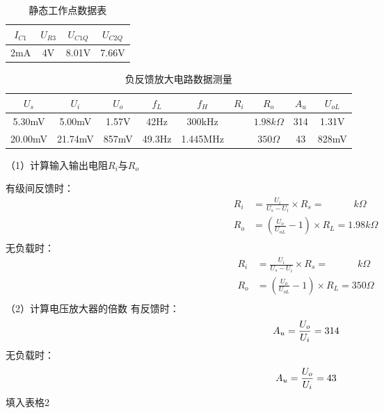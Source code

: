\documentclass{article}
\begin{document}
    \begin{table}[h]
        \centering  
        \begin{tabular}{c|c|c|c}
            \hline
                $I_{C1}$  &  $U_{R3}$    & $U_{C1Q}$     & $U_{C2Q}$   \\ \hline
                      2mA &   4V         & 8.01V         &7.66V        \\ \hline
        \end{tabular}
        \caption{静态工作点数据表}\label{SIGN}
        \end{table}
        
    \begin{table}[h]
        \centering  
        \begin{tabular}{c|c|c|c|c|c|c|c|c}
            \hline
            
                $U_s$   &  $U_i$    & $U_o$    & $f_L$  &  $f_H$    &  $R_i$                &  $R_o$          &  $A_u$  &  $U_{oL}$ \\ \hline
                5.30mV  &  5.00mV   & 1.57V    & 42Hz   &  300kHz   & \qquad \qquad \qquad  &  $1.98k\Omega$  &  314    &  1.31V    \\ \hline
                20.00mV &  21.74mV  & 857mV    & 49.3Hz &  1.445MHz & \qquad \qquad \qquad  &  $350\Omega$    &  43     &  828mV    \\ \hline
        \end{tabular}
        \caption{负反馈放大电路数据测量}\label{SIGN}
        \end{table}
        
	（1）计算输入输出电阻$R_i$与$R_o$\par
	有级间反馈时：
	\begin{align*}
		\ R_{i}&=\frac{U_i}{U_s-U_i}\times R_s=\qquad \quad k\Omega\\
		\ R_{o}&=(\frac{U_o}{U_{oL}}-1)\times R_L=1.98k\Omega\\
	\end{align*}
	无负载时：
	\begin{align*}
		\ R_{i}&=\frac{U_i}{U_s-U_i}\times R_s=\qquad \quad k\Omega\\
		\ R_{o}&=(\frac{U_o}{U_{oL}}-1)\times R_L=350\Omega\\
	\end{align*}
	（2）计算电压放大器的倍数
	有反馈时：
	\begin{equation*}
		\ A_{u}=\frac{U_{o}}{U_i}=314\\
	\end{equation*}
	无负载时：
	\begin{equation*}
		\ A_{u}=\frac{U_{o}}{U_i}=43\\
	\end{equation*}
	填入表格2
	
\end{document}
